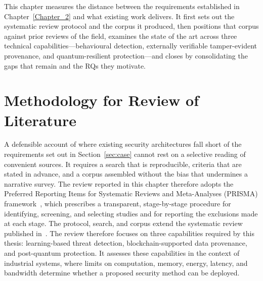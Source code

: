 \label{Chapter_3}

This chapter measures the distance between the requirements established in
Chapter~\ref{Chapter_2} and what existing work delivers. It first sets out the
systematic review protocol and the corpus it produced, then positions that
corpus against prior reviews of the field, examines the state of the art across
three technical capabilities---behavioural detection, externally verifiable
tamper-evident provenance, and quantum-resilient protection---and closes by
consolidating the gaps that remain and the RQs they motivate.

\section{Methodology for Review of Literature}
\label{sec:review-method}

A defensible account of where existing security architectures fall short of the
requirements set out in Section~\ref{sec:case} cannot rest on a selective reading
of convenient sources. It requires a search that is reproducible, criteria that
are stated in advance, and a corpus assembled without the bias that undermines a
narrative survey. The review reported in this chapter therefore adopts the
Preferred Reporting Items for Systematic Reviews and Meta-Analyses (PRISMA)
framework~\cite{prisma}, which prescribes a transparent, stage-by-stage
procedure for identifying, screening, and selecting studies and for reporting the
exclusions made at each stage. The protocol, search, and corpus extend the
systematic review published in~\cite{amadi2026security}. The review therefore
focuses on three capabilities required by this thesis: learning-based threat
detection, blockchain-supported data provenance, and post-quantum protection.
It assesses these capabilities in the context of industrial systems, where
limits on computation, memory, energy, latency, and bandwidth determine whether
a proposed security method can be deployed.

